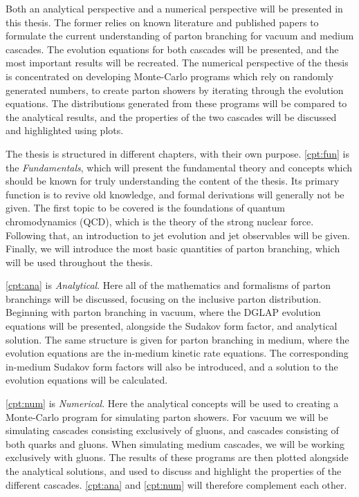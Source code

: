\documentclass[main.tex]{subfiles}
\begin{document}
Both an analytical perspective and a numerical perspective will be presented in this thesis. The former relies on known literature and published papers to formulate the current understanding of parton branching for vacuum and medium cascades. The evolution equations for both cascades will be presented, and the most important results will be recreated. The numerical perspective of the thesis is concentrated on developing Monte-Carlo programs which rely on randomly generated numbers, to create parton showers by iterating through the evolution equations. The distributions generated from these programs will be compared to the analytical results, and the properties of the two cascades will be discussed and highlighted using plots.

The thesis is structured in different chapters, with their own purpose. \autoref{cpt:fun} is the \textit{Fundamentals}, which will present the fundamental theory and concepts which should be known for truly understanding the content of the thesis. Its primary function is to revive old knowledge, and formal derivations will generally not be given. The first topic to be covered is the foundations of quantum chromodynamics (QCD), which is the theory of the strong nuclear force. Following that, an introduction to jet evolution and jet observables will be given. Finally, we will introduce the most basic quantities of parton branching, which will be used throughout the thesis.

\autoref{cpt:ana} is \textit{Analytical}. Here all of the mathematics and formalisms of parton branchings will be discussed, focusing on the inclusive parton distribution. Beginning with parton branching in vacuum, where the DGLAP evolution equations will be presented, alongside the Sudakov form factor, and analytical solution. The same structure is given for parton branching in medium, where the evolution equations are the in-medium kinetic rate equations. The corresponding in-medium Sudakov form factors will also be introduced, and a solution to the evolution equations will be calculated.

\autoref{cpt:num} is \textit{Numerical}. Here the analytical concepts will be used to creating a Monte-Carlo program for simulating parton showers. For vacuum we will be simulating cascades consisting exclusively of gluons, and cascades consisting of both quarks and gluons. When simulating medium cascades, we will be working exclusively with gluons. The results of these programs are then plotted alongside the analytical solutions, and used to discuss and highlight the properties of the different cascades. \autoref{cpt:ana} and \autoref{cpt:num} will therefore complement each other. 
\end{document}
